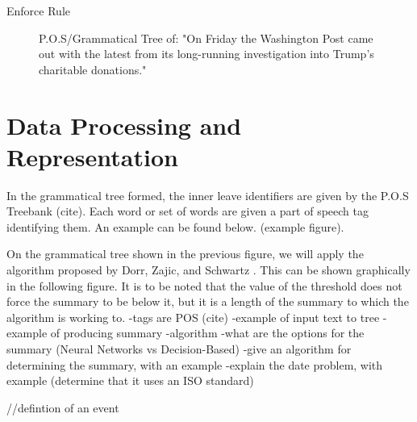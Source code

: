 \begin{algorithm}
\label{alg:enforceRule}
\caption{Enforce Rule}
\end{algorithm}
\begin{figure}
\caption{P.O.S/Grammatical Tree of: "On Friday the Washington Post came out with the latest from its long-running investigation into Trump's charitable donations."}
\end{figure}
\section{Data Processing and Representation}
\par In the grammatical tree formed, the inner leave identifiers are given by the P.O.S Treebank (cite). Each word or set of words are given a part of speech tag identifying them. An example can be found below. (example figure).
\par On the grammatical tree shown in the previous figure, we will apply the algorithm proposed by Dorr, Zajic, and Schwartz \cite{dorrzajicschwartz2003}. This can be shown graphically in the following figure. It is to be noted that the value of the threshold does not force the summary to be below it, but it is a length of the summary to which the algorithm is working to.
-tags are POS (cite)
-example of input text to tree
-example of producing summary
-algorithm
-what are the options for the summary (Neural Networks vs Decision-Based)
-give an algorithm for determining the summary, with an example
-explain the date problem, with example (determine that it uses an ISO standard)



//defintion of an event

